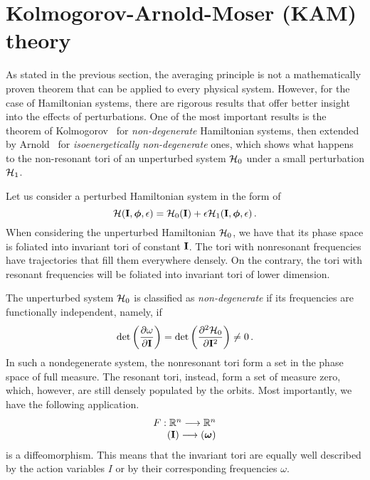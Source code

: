 \section{Kolmogorov-Arnold-Moser (KAM) theory}\label{sec:1:kam}

As stated in the previous section, the averaging principle is not a mathematically proven theorem that can be applied to every physical system. However, for the case of Hamiltonian systems, there are rigorous results that offer better insight into the effects of perturbations. One of the most important results is the theorem of Kolmogorov~\cite{KAM1} for \textit{non-degenerate} Hamiltonian systems, then extended by Arnold~\cite{KAM3} for \textit{isoenergetically non-degenerate} ones, which shows what happens to the non-resonant tori of an unperturbed system $\mathcal{H}_0$ under a small perturbation $\mathcal{H}_1$.

Let us consider a perturbed Hamiltonian system in the form of
\begin{equation}
    \mathcal{H}(\vb{I}, \boldsymbol{\phi}, \epsilon) = \mathcal{H}_0(\vb{I}) + \epsilon\mathcal{H}_1(\vb{I},\boldsymbol{\phi},\epsilon)\,.
    \label{eq:1:hamperturbed}
\end{equation}
When considering the unperturbed Hamiltonian $\mathcal{H}_0$, we have that its phase space is foliated into invariant tori of constant $\vb{I}$. The tori with nonresonant frequencies have trajectories that fill them everywhere densely. On the contrary, the tori with resonant frequencies will be foliated into invariant tori of lower dimension.

The unperturbed system $\mathcal{H}_0$ is classified as \textit{non-degenerate} if its frequencies are functionally independent, namely, if
\begin{equation}
    \det\left(\pdv{\omega}{\vb{I}}\right) = \det\left(\pdv[2]{\mathcal{H}_0}{\vb{I}}\right) \neq 0 \,.
\end{equation}
In such a nondegenerate system, the nonresonant tori form a set in the phase space of full measure. The resonant tori, instead, form a set of measure zero, which, however, are still densely populated by the orbits. Most importantly, we have the following application.
\begin{equation}
    \begin{array}{r}
    F: \mathbb{R}^{n} \longrightarrow \mathbb{R}^n \\
    (\vb{I}) \longrightarrow(\boldsymbol{\omega})
    \end{array}
\end{equation}
is a diffeomorphism. This means that the invariant tori are equally well described by the action variables $I$ or by their corresponding frequencies $\omega$.

